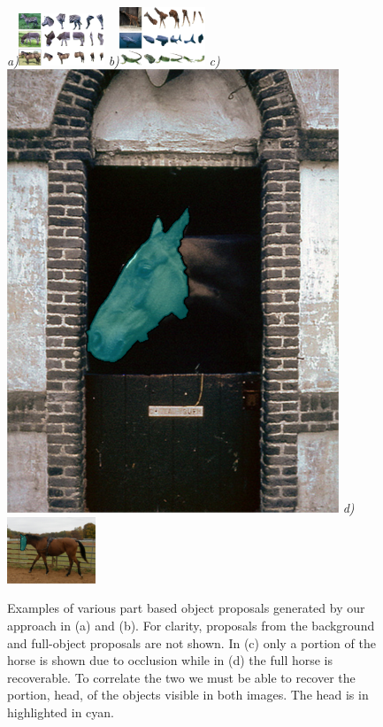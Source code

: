 \begin{figure}[ht]
\centering
{\footnotesize\textit{a)}}\includegraphics[width=0.229\textwidth]{figs/all_frags_per_image_part1.png}
{\footnotesize\textit{b)}}\includegraphics[width=0.229\textwidth]{figs/all_frags_per_image_part2.png}
{\footnotesize\textit{c)}}\includegraphics[height=0.13\textheight]{figs/horse_occlude.png}
{\footnotesize\textit{d)}}\includegraphics[width=0.235\textwidth]{figs/horse_no_occlude.png}
\caption{Examples of various part based object proposals generated by our approach in (a) and (b). For clarity, proposals from the background and full-object proposals are not shown. In (c) only a portion of the horse is shown due to occlusion while in (d) the full horse is recoverable. To correlate the two we must be able to recover the portion, head, of the objects visible in both images. The head is in highlighted in cyan. }
\label{fig:part_ops}
\end{figure}

